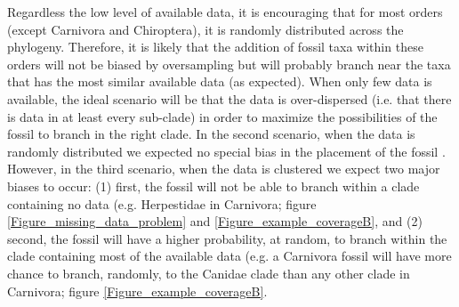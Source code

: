 \documentclass[12pt,letterpaper]{article}
\renewcommand{\subsection}[1]{%
\bigskip
\begin{center}
\begin{large}
\normalfont\itshape #1
\end{large}
\end{center}}
\begin{document}
Regardless the low level of available data, it is encouraging that for most orders (except Carnivora and Chiroptera), it is randomly distributed across the phylogeny. Therefore, it is likely that the addition of fossil taxa within these orders will not be biased by oversampling but will probably branch near the taxa that has the most similar available data (as expected). When only few data is available, the ideal scenario will be that the data is over-dispersed (i.e. that there is data in at least every sub-clade) in order to maximize the possibilities of the fossil to branch in the right clade. In the second scenario, when the data is randomly distributed we expected no special bias in the placement of the fossil \citep{GuillermeCooper}. However, in the third scenario, when the data is clustered we expect two major biases to occur: (1) first, the fossil will not be able to branch within a clade containing no data (e.g. Herpestidae in Carnivora; figure \ref{Figure_missing_data_problem} and \ref{Figure_example_coverageB}, and (2) second, the fossil will have a higher probability, at random, to branch within the clade containing most of the available data (e.g. a Carnivora fossil will have more chance to branch, randomly, to the Canidae clade than any other clade in Carnivora; figure \ref{Figure_example_coverageB}.

\end{document}
